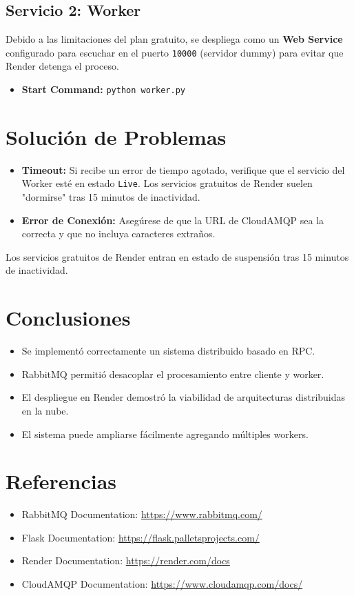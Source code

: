 \documentclass[12pt,a4paper]{article}
\begin{document}
\subsection{Servicio 2: Worker}
Debido a las limitaciones del plan gratuito, se despliega como un \textbf{Web Service} configurado para escuchar en el puerto \texttt{10000} (servidor dummy) para evitar que Render detenga el proceso.
\begin{itemize}
    \item \textbf{Start Command:} \texttt{python worker.py}
\end{itemize}

\section{Solución de Problemas}
\begin{itemize}
    \item \textbf{Timeout:} Si recibe un error de tiempo agotado, verifique que el servicio del Worker esté en estado \texttt{Live}. Los servicios gratuitos de Render suelen "dormirse" tras 15 minutos de inactividad.
    \item \textbf{Error de Conexión:} Asegúrese de que la URL de CloudAMQP sea la correcta y que no incluya caracteres extraños.
\end{itemize}
\begin{tcolorbox}[colback=yellow!10]
    Los servicios gratuitos de Render entran en estado de suspensión tras 15 minutos de inactividad.
\end{tcolorbox}
\section{Conclusiones}

\begin{itemize}
    \item Se implementó correctamente un sistema distribuido basado en RPC.
    \item RabbitMQ permitió desacoplar el procesamiento entre cliente y worker.
    \item El despliegue en Render demostró la viabilidad de arquitecturas distribuidas en la nube.
    \item El sistema puede ampliarse fácilmente agregando múltiples workers.
\end{itemize}

\section{Referencias}

\begin{itemize}
    \item RabbitMQ Documentation: \url{https://www.rabbitmq.com/}
    \item Flask Documentation: \url{https://flask.palletsprojects.com/}
    \item Render Documentation: \url{https://render.com/docs}
    \item CloudAMQP Documentation: \url{https://www.cloudamqp.com/docs/}
\end{itemize}
\end{document}
